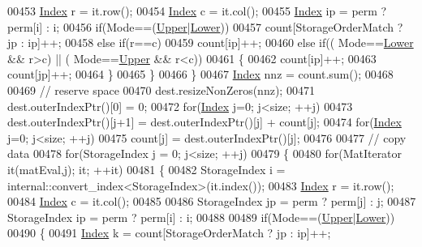 \begin{DoxyCode}
00453       \hyperlink{namespace_eigen_a62e77e0933482dafde8fe197d9a2cfde}{Index} r = it.row();
00454       \hyperlink{namespace_eigen_a62e77e0933482dafde8fe197d9a2cfde}{Index} c = it.col();
00455       \hyperlink{namespace_eigen_a62e77e0933482dafde8fe197d9a2cfde}{Index} ip = perm ? perm[i] : i;
00456       \textcolor{keywordflow}{if}(Mode==(\hyperlink{group__enums_gga39e3366ff5554d731e7dc8bb642f83cda6bcb58be3b8b8ec84859ce0c5ac0aaec}{Upper}|\hyperlink{group__enums_gga39e3366ff5554d731e7dc8bb642f83cda891792b8ed394f7607ab16dd716f60e6}{Lower}))
00457         count[StorageOrderMatch ? jp : ip]++;
00458       \textcolor{keywordflow}{else} \textcolor{keywordflow}{if}(r==c)
00459         count[ip]++;
00460       \textcolor{keywordflow}{else} \textcolor{keywordflow}{if}(( Mode==\hyperlink{group__enums_gga39e3366ff5554d731e7dc8bb642f83cda891792b8ed394f7607ab16dd716f60e6}{Lower} && r>c) || ( Mode==\hyperlink{group__enums_gga39e3366ff5554d731e7dc8bb642f83cda6bcb58be3b8b8ec84859ce0c5ac0aaec}{Upper} && r<c))
00461       \{
00462         count[ip]++;
00463         count[jp]++;
00464       \}
00465     \}
00466   \}
00467   \hyperlink{namespace_eigen_a62e77e0933482dafde8fe197d9a2cfde}{Index} nnz = count.sum();
00468   
00469   \textcolor{comment}{// reserve space}
00470   dest.resizeNonZeros(nnz);
00471   dest.outerIndexPtr()[0] = 0;
00472   \textcolor{keywordflow}{for}(\hyperlink{namespace_eigen_a62e77e0933482dafde8fe197d9a2cfde}{Index} j=0; j<size; ++j)
00473     dest.outerIndexPtr()[j+1] = dest.outerIndexPtr()[j] + count[j];
00474   \textcolor{keywordflow}{for}(\hyperlink{namespace_eigen_a62e77e0933482dafde8fe197d9a2cfde}{Index} j=0; j<size; ++j)
00475     count[j] = dest.outerIndexPtr()[j];
00476   
00477   \textcolor{comment}{// copy data}
00478   \textcolor{keywordflow}{for}(StorageIndex j = 0; j<size; ++j)
00479   \{
00480     \textcolor{keywordflow}{for}(MatIterator it(matEval,j); it; ++it)
00481     \{
00482       StorageIndex i = internal::convert\_index<StorageIndex>(it.index());
00483       \hyperlink{namespace_eigen_a62e77e0933482dafde8fe197d9a2cfde}{Index} r = it.row();
00484       \hyperlink{namespace_eigen_a62e77e0933482dafde8fe197d9a2cfde}{Index} c = it.col();
00485       
00486       StorageIndex jp = perm ? perm[j] : j;
00487       StorageIndex ip = perm ? perm[i] : i;
00488       
00489       \textcolor{keywordflow}{if}(Mode==(\hyperlink{group__enums_gga39e3366ff5554d731e7dc8bb642f83cda6bcb58be3b8b8ec84859ce0c5ac0aaec}{Upper}|\hyperlink{group__enums_gga39e3366ff5554d731e7dc8bb642f83cda891792b8ed394f7607ab16dd716f60e6}{Lower}))
00490       \{
00491         \hyperlink{namespace_eigen_a62e77e0933482dafde8fe197d9a2cfde}{Index} k = count[StorageOrderMatch ? jp : ip]++;

\end{DoxyCode}
